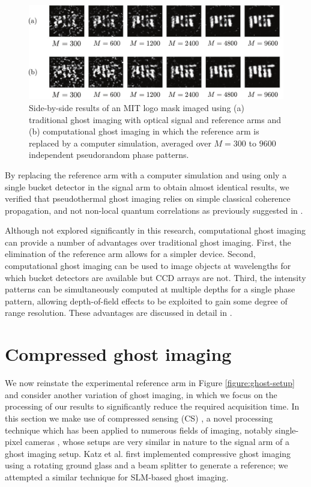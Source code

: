 \begin{figure}[t]
\begin{center}
\includegraphics[width=16cm]{figure-ghost-computational-result.pdf}
\caption{Side-by-side results of an MIT logo mask imaged using (a) traditional ghost imaging with optical signal and reference arms and (b) computational ghost imaging in which the reference arm is replaced by a computer simulation, averaged over $M = 300$ to $9600$ independent pseudorandom phase patterns.}
\label{figure:ghost-computational-result}
\end{center}
\end{figure}

By replacing the reference arm with a computer simulation and using only a single bucket detector in the signal arm to obtain almost identical results, we verified that pseudothermal ghost imaging relies on simple classical coherence propagation, and not non-local quantum correlations as previously suggested in \cite{scarcelli-can}.

Although not explored significantly in this research, computational ghost imaging can provide a number of advantages over traditional ghost imaging. First, the elimination of the reference arm allows for a simpler device. Second, computational ghost imaging can be used to image objects at wavelengths for which bucket detectors are available but CCD arrays are not. Third, the intensity patterns can be simultaneously computed at multiple depths for a single phase pattern, allowing depth-of-field effects to be exploited to gain some degree of range resolution. These advantages are discussed in detail in \cite{erkmen-from}.

\section{Compressed ghost imaging}

We now reinstate the experimental reference arm in Figure \ref{figure:ghost-setup} and consider another variation of ghost imaging, in which we focus on the processing of our results to significantly reduce the required acquisition time. In this section we make use of compressed sensing (CS) \cite{candes-stable}, a novel processing technique which has been applied to numerous fields of imaging, notably single-pixel cameras \cite{duarte-single}, whose setups are very similar in nature to the signal arm of a ghost imaging setup. Katz et al. \cite{katz-compressive} first implemented compressive ghost imaging using a rotating ground glass and a beam splitter to generate a reference; we attempted a similar technique for SLM-based ghost imaging.

